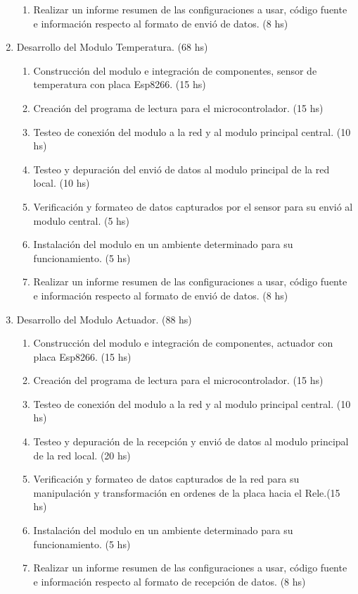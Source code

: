 \documentclass[11pt]{charter}
\begin{document}
\begin{enumerate}
\begin{enumerate}
	\item Realizar un informe resumen de las configuraciones a usar, código fuente e información respecto al formato de envió de datos. (8 hs)
	\end{enumerate}
\item Desarrollo del Modulo Temperatura. (68 hs)
	\begin{enumerate}
	\item Construcción del modulo e integración de componentes, sensor de temperatura con placa Esp8266. (15 hs)
	\item Creación del programa de lectura para el microcontrolador. (15 hs)
	\item Testeo de conexión del modulo a la red y al modulo principal central. (10 hs)
	\item Testeo y depuración del envió de datos al modulo principal de la red local. (10 hs)
	\item Verificación y formateo de datos capturados por el sensor para su envió al modulo central. (5 hs)
	\item Instalación del modulo en un ambiente determinado para su funcionamiento. (5 hs)
	\item Realizar un informe resumen de las configuraciones a usar, código fuente e información respecto al formato de envió de datos. (8 hs)
	\end{enumerate}
\item Desarrollo del Modulo Actuador. (88 hs)
	\begin{enumerate}
	\item Construcción del modulo e integración de componentes, actuador con placa Esp8266. (15 hs)
	\item Creación del programa de lectura para el microcontrolador. (15 hs)
	\item Testeo de conexión del modulo a la red y al modulo principal central. (10 hs)
	\item Testeo y depuración de la recepción y envió de datos al modulo principal de la red local. (20 hs)
	\item Verificación y formateo de datos capturados de la red para su manipulación y transformación en ordenes de la placa hacia el Rele.(15 hs)
	\item Instalación del modulo en un ambiente determinado para su funcionamiento. (5 hs)
	\item Realizar un informe resumen de las configuraciones a usar, código fuente e información respecto al formato de recepción de datos. (8 hs)

\end{enumerate}
\end{enumerate}
\end{document}
